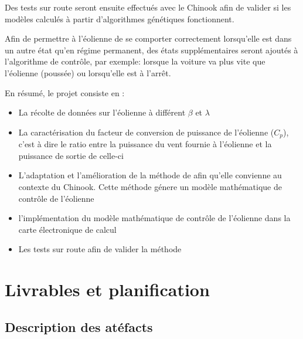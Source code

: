 \documentclass[11pt]{article}
\begin{document}
Des tests sur route seront ensuite effectués avec le Chinook afin de valider si les modèles calculés à partir d'algorithmes génétiques fonctionnent.

Afin de permettre à l'éolienne de se comporter correctement lorsqu'elle est dans un autre état qu'en régime permanent, des états supplémentaires seront ajoutés à l'algorithme de contrôle, par exemple: lorsque la voiture va plus vite que l'éolienne (poussée) ou lorsqu'elle est à l'arrêt.


En résumé, le projet consiste en :
\begin{itemize}
  \item La récolte de données sur l'éolienne à différent $\beta$ et $\lambda$
  \item La caractérisation du facteur de conversion de puissance de l'éolienne ($C_p$), c'est à dire le ratio entre la puissance du vent fournie à l'éolienne et la puissance de sortie de celle-ci
  \item L'adaptation et l'amélioration de la méthode de \cite{Ouissam12} afin qu'elle convienne au contexte du Chinook. Cette méthode génere un modèle mathématique de contrôle de l'éolienne
  \item l'implémentation du modèle mathématique de contrôle de l'éolienne dans la carte électronique de calcul
  \item Les tests sur route afin de valider la méthode
\end{itemize}

\section{Livrables et planification}
\subsection{Description des atéfacts}
\end{document}
